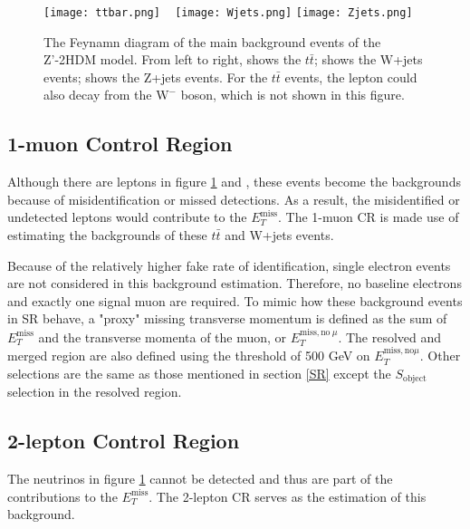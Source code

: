 \documentclass[class=NCU_thesis, crop=false]{standalone}
\begin{document}
	\begin{figure}[!hbt]
		\centering
		\subcaptionbox
		{\label{fig:subfig_ttbar}}
		{\texttt{[image: ttbar.png]}}
		~
		\subcaptionbox
		{\label{fig:subfig_Wjets}}
		{\texttt{[image: Wjets.png]}}
		\subcaptionbox
		{\label{fig:subfig_Zjets}}
		{\texttt{[image: Zjets.png]}}
		\caption{The Feynamn diagram of the main background events of the Z'-2HDM model. From left to right,  shows the $t\bar{t}$;  shows the W+jets events;  shows the Z+jets events. For the $t\bar{t}$ events, the lepton could also decay from the $\mathrm{W^-}$ boson, which is not shown in this figure.}
		\label{fig:background}
	\end{figure}

	\subsection{1-muon Control Region}
		Although there are leptons in figure \ref{fig:background}  and , these events become the backgrounds because of misidentification or missed detections. As a result, the misidentified or undetected leptons would contribute to the $E_T^{\mathrm{miss}}$. The 1-muon CR is made use of estimating the backgrounds of these $t\bar{t}$ and W+jets events.
	
		Because of the relatively higher fake rate of identification, single electron events are not considered in this background estimation. Therefore, no baseline electrons and exactly one signal muon are required. To mimic how these background events in SR behave, a "proxy" missing transverse momentum is defined as the sum of $E_T^{\mathrm{miss}}$ and the transverse momenta of the muon, or $E_T^{\mathrm{miss, no}\ \mu}$. The resolved and merged region are also defined using the threshold of 500 GeV on $E_T^{\mathrm{miss, no } \mu}$. Other selections are the same as those mentioned in section \ref{SR} except the $S_{\mathrm{object}}$ selection in the resolved region.
	
	\subsection{2-lepton Control Region}
		The neutrinos in figure \ref{fig:background}  cannot be detected and thus are part of the contributions to the $E_T^{\mathrm{miss}}$. The 2-lepton CR serves as the estimation of this background.
		
\end{document}
